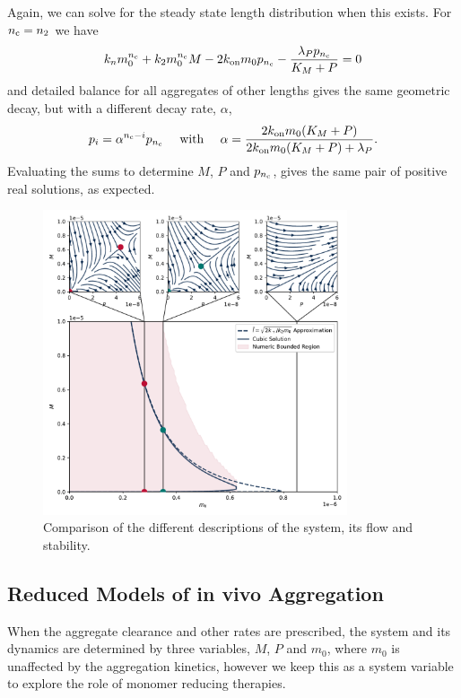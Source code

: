 Again, we can solve for the steady state length distribution when this exists. For $n_{\mathrm{c}}=n_2$ we have
\begin{equation}
    k_n m_0^{n_{\mathrm{c}}} + k_2 m_0^{n_{\mathrm{c}}} M - 2 k_\text{on} m_0 p_{n_{\mathrm{c}}} - \frac{\lambda_P p_{n_{\mathrm{c}}}}{K_M + P} = 0
\end{equation}
and detailed balance for all aggregates of other lengths gives the same geometric decay, but with a different decay rate, $\alpha$,
\begin{equation}
    p_i = \alpha^{n_{\mathrm{c}}-i} p_{n_{\mathrm{c}}}\quad\text{ with }\quad\alpha=\frac{2k_\text{on} m_0 (K_M + P)}{2k_\text{on} m_0 (K_M + P) + \lambda_P}.
\end{equation}
Evaluating the sums to determine $M$, $P$ and $p_{n_{\mathrm{c}}}$, gives the same pair of positive real solutions, as expected.

\begin{figure}
    \centering
    \includegraphics[width=0.8\textwidth]{figures/4-agg-figs/confusingNumericRegion.pdf}
    \caption{Comparison of the different descriptions of the system, its flow and stability.}
    \label{fig:4-steadyMM}
\end{figure}

\subsection{Reduced Models of in vivo Aggregation}

When the aggregate clearance and other rates are prescribed, the system and its dynamics are determined by three variables, $M$, $P$ and $m_0$, where $m_0$ is unaffected by the aggregation kinetics, however we keep this as a system variable to explore the role of monomer reducing therapies.

